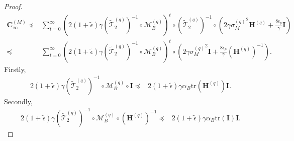 \documentclass[11pt, letterpaper]{article}
\begin{document}
\begin{proof}
\begin{equation}
        \label{eq: f13}
        \begin{aligned}
            \mathbf{C}_{\infty}^{(M)}\preceq&\sum_{t=0}^\infty\left(2(1+\tilde{\epsilon})\gamma(\widetilde{\mathcal{T}}_2^{(q)})^{-1}\circ\mathcal{M}_B^{(q)}\right)^t\circ(\widetilde{\mathcal{T}}_2^{(q)})^{-1}\circ\left(2\gamma{\sigma_M^{(q)}}^2\mathbf{H}^{(q)}+\frac{8\epsilon_p}{\gamma}\mathbf{I}\right)\\
            \preceq&\sum_{t=0}^\infty\left(2(1+\tilde{\epsilon})\gamma(\widetilde{\mathcal{T}}_2^{(q)})^{-1}\circ\mathcal{M}_B^{(q)}\right)^t\circ\left(2\gamma{\sigma_M^{(q)}}^2\mathbf{I}+\frac{8\epsilon_p}{\gamma}(\mathbf{H}^{(q)})^{-1}\right).
        \end{aligned}
    \end{equation}
    Firstly,
    \begin{equation}
        \label{eq: f14}
        \begin{aligned}
            2(1+\tilde{\epsilon})\gamma(\widetilde{\mathcal{T}}_2^{(q)})^{-1}\circ\mathcal{M}_B^{(q)}\circ \mathbf{I}\preceq &2(1+\tilde{\epsilon})\gamma\alpha_B\mathrm{tr}(\mathbf{H}^{(q)})\mathbf{I}.
        \end{aligned}
    \end{equation}
    Secondly,
    \begin{equation}
        \label{eq: f15}
        \begin{aligned}
            2(1+\tilde{\epsilon})\gamma(\widetilde{\mathcal{T}}_2^{(q)})^{-1}\circ\mathcal{M}_B^{(q)}\circ (\mathbf{H}^{(q)})^{-1}\preceq&2(1+\tilde{\epsilon})\gamma\alpha_B \mathrm{tr}(\mathbf{I})\mathbf{I}.
        \end{aligned}
    \end{equation}


\end{proof}
\end{document}
